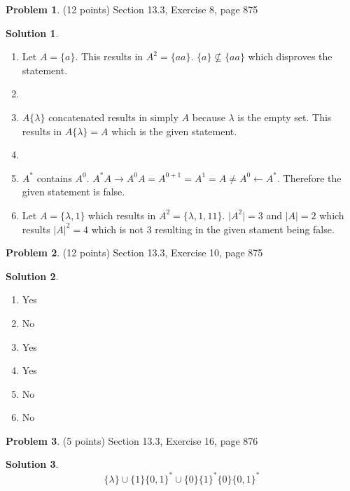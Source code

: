 \documentclass{article}
\theoremstyle{definition}
\newtheorem{problem}{Problem}
\newtheorem*{solution}{Solution}
\begin{document}
\begin{problem} (12 points)
Section 13.3, Exercise 8, page 875
\end{problem}
\begin{solution} \ \\
\begin{enumerate}
  \item Let $ A = \{ a \} $. This results in $A^2 = \{ aa \}$. $\{ a \} \nsubseteq \{ aa \} $ which disproves the statement.
  
  \item 
  
  \item $A\{\lambda \}$ concatenated results in simply $A$ because $\lambda$ is the empty set.
  This results in $A\{\lambda \} = A$ which is the given statement.
  
  \item 
  
  \item $A^*$ contains $A^0$. $A^* A \rightarrow A^0 A = A^{0+1} = A^1 = A \neq A^0 \leftarrow A^*$. Therefore the given statement is false.  
  
  \item
  Let $A = \{\lambda, 1 \}$ which results in $A^2 = \{\lambda, 1, 11 \}$. $\vert A^2 \vert = 3$ and $\vert A \vert = 2$ which results $\vert A \vert ^2 = 4$ which is not 3 resulting in the given stament being false.
\end{enumerate}
\end{solution}

\begin{problem} (12 points)
Section 13.3, Exercise 10, page 875
\end{problem}
\begin{solution} \ \\
\begin{enumerate}
  \item Yes
  \item No
  \item Yes
  \item Yes
  \item No
  \item No
\end{enumerate}
\end{solution}

\begin{problem} (5 points)
Section 13.3, Exercise 16, page 876
\end{problem}
\begin{solution} 
$$\{\lambda \} \cup \{1\}\{0,1\}^* \cup \{0\}\{1\}^*\{0\}\{0,1\}^*$$
\end{solution}
\end{document}
